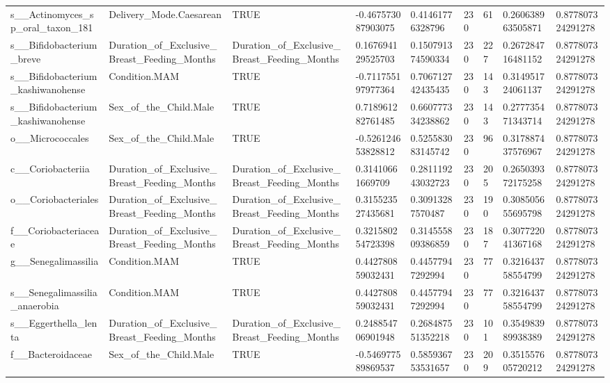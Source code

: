 \begin{longtable}{lllllllll}
s\_\_Actinomyces\_sp\_oral\_taxon\_181 & Delivery\_Mode.Caesarean & TRUE & -0.467573087903075 & 0.41461776328796 & 230 & 61 & 0.260638963505871 & 0.877807324291278 \\
s\_\_Bifidobacterium\_breve & Duration\_of\_Exclusive\_Breast\_Feeding\_Months & Duration\_of\_Exclusive\_Breast\_Feeding\_Months & 0.167694129525703 & 0.150791374590334 & 230 & 227 & 0.267284716481152 & 0.877807324291278 \\
s\_\_Bifidobacterium\_kashiwanohense & Condition.MAM & TRUE & -0.711755197977364 & 0.706712742435435 & 230 & 143 & 0.314951724061137 & 0.877807324291278 \\
s\_\_Bifidobacterium\_kashiwanohense & Sex\_of\_the\_Child.Male & TRUE & 0.718961282761485 & 0.660777334238862 & 230 & 143 & 0.277735471343714 & 0.877807324291278 \\
o\_\_Micrococcales & Sex\_of\_the\_Child.Male & TRUE & -0.526124653828812 & 0.525583083145742 & 230 & 96 & 0.317887437576967 & 0.877807324291278 \\
c\_\_Coriobacteriia & Duration\_of\_Exclusive\_Breast\_Feeding\_Months & Duration\_of\_Exclusive\_Breast\_Feeding\_Months & 0.31410661669709 & 0.281119243032723 & 230 & 205 & 0.265039372175258 & 0.877807324291278 \\
o\_\_Coriobacteriales & Duration\_of\_Exclusive\_Breast\_Feeding\_Months & Duration\_of\_Exclusive\_Breast\_Feeding\_Months & 0.315523527435681 & 0.30913287570487 & 230 & 190 & 0.308505655695798 & 0.877807324291278 \\
f\_\_Coriobacteriaceae & Duration\_of\_Exclusive\_Breast\_Feeding\_Months & Duration\_of\_Exclusive\_Breast\_Feeding\_Months & 0.321580254723398 & 0.314555809386859 & 230 & 187 & 0.307722041367168 & 0.877807324291278 \\
g\_\_Senegalimassilia & Condition.MAM & TRUE & 0.442780859032431 & 0.44577947292994 & 230 & 77 & 0.321643758554799 & 0.877807324291278 \\
s\_\_Senegalimassilia\_anaerobia & Condition.MAM & TRUE & 0.442780859032431 & 0.44577947292994 & 230 & 77 & 0.321643758554799 & 0.877807324291278 \\
s\_\_Eggerthella\_lenta & Duration\_of\_Exclusive\_Breast\_Feeding\_Months & Duration\_of\_Exclusive\_Breast\_Feeding\_Months & 0.248854706901948 & 0.268487551352218 & 230 & 101 & 0.354983989938389 & 0.877807324291278 \\
f\_\_Bacteroidaceae & Sex\_of\_the\_Child.Male & TRUE & -0.546977589869537 & 0.585936753531657 & 230 & 209 & 0.351557605720212 & 0.877807324291278 \\

\end{longtable}
